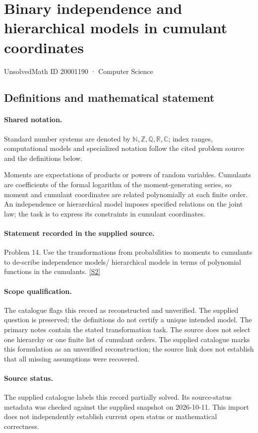 \documentclass[11pt]{article}
\newcommand{\sref}[2]{\hyperlink{source:#1:#2}{[S#2]}}
\begin{document}
\setcounter{section}{20001189}
\section{Binary independence and hierarchical models in cumulant coordinates}\label{20001190}
{\small\sffamily UnsolvedMath ID 20001190 · Computer Science}
\subsection{Definitions and mathematical statement}

\paragraph{Shared notation.}Standard number systems are denoted by $\mathbb N,\mathbb Z,\mathbb Q,\mathbb R,\mathbb C$; index ranges, computational models and specialized notation follow the cited problem source and the definitions below.


Moments are expectations of products or powers of random variables. Cumulants are coefficients of the formal logarithm of the moment-generating series, so moment and cumulant coordinates are related polynomially at each finite order. An independence or hierarchical model imposes specified relations on the joint law; the task is to express its constraints in cumulant coordinates.
\paragraph{Statement recorded in the supplied source.}
Problem 14. Use the transformations from probabilities to moments to cumulants to de-scribe independence models/ hierarchical models in terms of polynomial functions in the cumulants. \sref{20001190}{2}
\paragraph{Scope qualification.}
The catalogue flags this record as reconstructed and unverified. The supplied question is preserved; the definitions do not certify a unique intended model. The primary notes contain the stated transformation task. The source does not select one hierarchy or one finite list of cumulant orders.
The supplied catalogue marks this formulation as an unverified reconstruction; the source link does not establish that all missing assumptions were recovered.
\paragraph{Source status.}
The supplied catalogue labels this record partially solved. Its source-status metadata was checked against the supplied snapshot on 2026-10-11. This import does not independently establish current open status or mathematical correctness.
\end{document}
